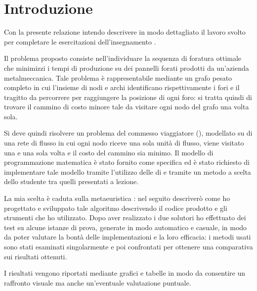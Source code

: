 \section{Introduzione}
Con la presente relazione intendo descrivere in modo dettagliato il lavoro svolto per completare le esercitazioni dell'insegnamento \memoclong.

Il problema proposto consiste nell'individuare la sequenza di foratura ottimale che minimizzi i tempi di produzione su dei pannelli forati prodotti da un'azienda metalmeccanica.
Tale problema è rappresentabile mediante un grafo pesato completo in cui l'insieme di nodi e archi identificano rispettivamente i fori e il tragitto da percorrere per raggiungere la posizione di ogni foro: si tratta quindi di trovare il cammino di costo minore tale da visitare ogni nodo del grafo una volta sola.

Si deve quindi risolvere un problema del commesso viaggiatore (), modellato su di una rete di flusso in cui ogni nodo riceve una sola unità di flusso, viene visitato una e una sola volta e il costo del cammino sia minimo.
Il modello di programmazione matematica è stato fornito come specifica ed è stato richiesto di implementare tale modello tramite l'utilizzo delle  di  e tramite un metodo a scelta dello studente tra quelli presentati a lezione.

La mia scelta è caduta sulla metaeuristica \tabu: nel seguito descriverò come ho progettato e sviluppato tale algoritmo descrivendo il codice prodotto e gli strumenti che ho utilizzato.
Dopo aver realizzato i due solutori ho effettuato dei test su alcune istanze di prova, generate in modo automatico e casuale, in modo da poter valutare la bontà delle implementazioni e la loro efficacia: i metodi usati sono stati esaminati singolarmente e poi confrontati per ottenere una comparativa sui risultati ottenuti.

I risultati vengono riportati mediante grafici e tabelle in modo da consentire un raffronto visuale ma anche un'eventuale valutazione puntuale.